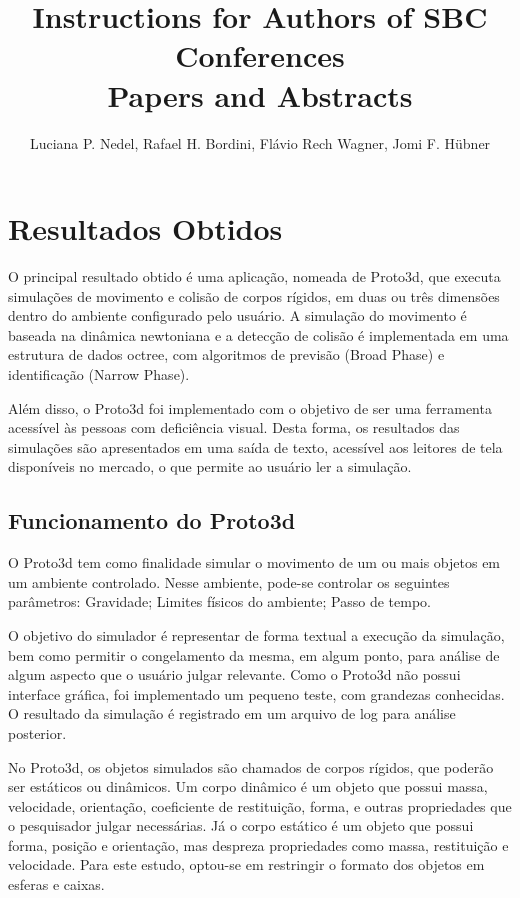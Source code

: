 \documentclass[12pt]{article}
\title{Instructions for Authors of SBC Conferences\\ Papers and Abstracts}
\author{Luciana P. Nedel\inst{1}, Rafael H. Bordini\inst{2}, Flávio Rech
  Wagner\inst{1}, Jomi F. Hübner\inst{3} }
\begin{document}
 

\maketitle

\begin{abstract}
\end{abstract}
     
\begin{resumo} 
\end{resumo}


\section{Resultados Obtidos}
O principal resultado obtido é uma aplicação, nomeada de Proto3d, que executa simulações de movimento e colisão de corpos rígidos, em duas ou três dimensões dentro do ambiente configurado pelo usuário. A simulação do movimento é baseada na dinâmica newtoniana e a detecção de colisão é implementada em uma estrutura de dados octree, com algoritmos de previsão (Broad Phase) e identificação (Narrow Phase).

Além disso, o Proto3d foi implementado com o objetivo de ser uma ferramenta acessível às pessoas com deficiência visual. Desta forma, os resultados das simulações são apresentados em uma saída de texto, acessível aos leitores de tela disponíveis no mercado, o que permite ao usuário ler a simulação.

\subsection {Funcionamento do Proto3d}
O Proto3d tem como finalidade simular o movimento de um ou mais objetos em um ambiente controlado. Nesse ambiente, pode-se controlar os seguintes parâmetros: Gravidade; Limites físicos do ambiente; Passo de tempo.

O objetivo do simulador é representar de forma textual a execução da simulação, bem como permitir o congelamento da mesma, em algum ponto, para análise de algum aspecto que o usuário julgar relevante. Como o Proto3d não possui interface gráfica, foi implementado um pequeno teste, com grandezas conhecidas. O resultado da simulação é registrado em um arquivo de log para análise posterior.

No Proto3d, os objetos simulados são chamados de corpos rígidos, que poderão ser estáticos ou dinâmicos. Um corpo dinâmico é um objeto que possui massa, velocidade, orientação, coeficiente de restituição, forma, e outras propriedades que o pesquisador julgar necessárias. Já o corpo estático é um objeto que possui forma, posição e orientação, mas despreza propriedades como massa, restituição e velocidade. Para este estudo, optou-se em restringir o formato dos objetos em esferas e caixas.
\end{document}
